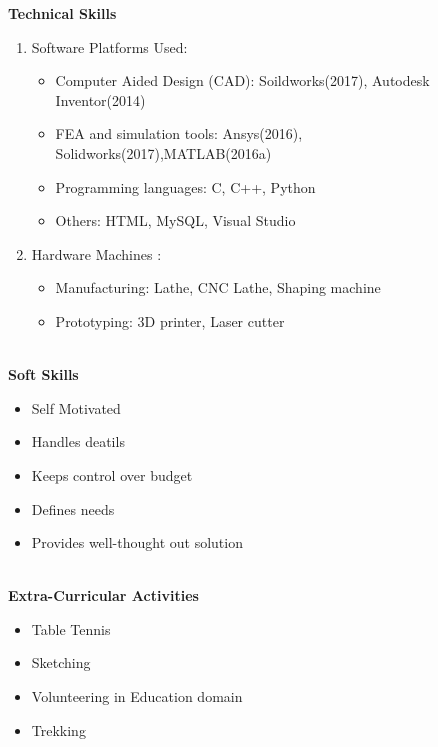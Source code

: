 \documentclass[letterpaper,11pt]{article}
\newcommand{\SmallSep}{\vspace{0.5em}}
\newcommand{\CVSection}[1]
{\Large\textbf{#1}\par
	\SmallSep\normalsize\normalfont}
\begin{document}
\CVSection{Technical Skills}

\begin{enumerate}
	\item Software Platforms Used:\\
	\begin{itemize}
		\item Computer Aided Design (CAD):
		Soildworks(2017), Autodesk Inventor(2014)	
		\item FEA and simulation tools:
		Ansys(2016), Solidworks(2017),MATLAB(2016a)
		\item Programming languages: 
		C, C++, Python
		\item Others: 
		HTML, MySQL, Visual Studio
		
	\end{itemize}
	
	\item Hardware Machines : 
	\begin{itemize}
		\item Manufacturing: Lathe, CNC Lathe, Shaping machine
		\item Prototyping: 3D printer, Laser cutter
		
	\end{itemize}
\end{enumerate}
\textbf{}  \\

\CVSection{Soft Skills}

\begin{itemize}
	\item Self Motivated
	\item Handles deatils  
	\item Keeps control over budget
	\item Defines needs
	\item Provides well-thought out solution
\end{itemize}
\textbf{}  \\

\CVSection{Extra-Curricular Activities}

\begin{itemize}
	\item Table Tennis
	\item Sketching 
	\item Volunteering in Education domain
	\item Trekking 
\end{itemize}
\textbf{}  \\
\textbf{}  \\
\end{document}
